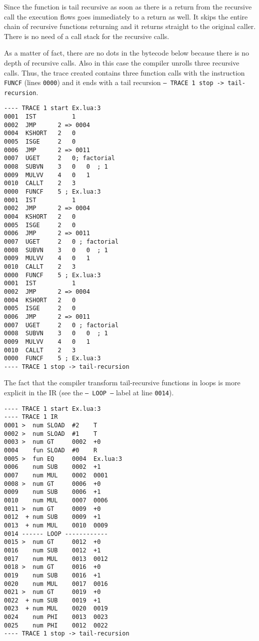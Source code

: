 \noindent
Since the function is tail recursive as soon as there is a return from the recursive call the execution flows goes immediately to a return as well. It skips the entire chain of recursive functions returning and it returns straight to the original caller. There is no need of a call stack for the recursive calls.

As a matter of fact, there are no dots in the bytecode below because there is no depth of recursive calls. Also in this case the compiler unrolls three recursive calls. Thus, the trace created contains three function calls with the instruction \texttt{FUNCF} (lines \texttt{0000}) and it ends with a tail recursion \texttt{-- TRACE 1 stop -> tail-recursion}.

\begin{multicols}{2}
\begin{lstlisting}[style=DumpStyle]
---- TRACE 1 start Ex.lua:3
0001  IST          1
0002  JMP      2 => 0004
0004  KSHORT   2   0
0005  ISGE     2   0
0006  JMP      2 => 0011
0007  UGET     2   0; factorial
0008  SUBVN    3   0   0  ; 1
0009  MULVV    4   0   1
0010  CALLT    2   3
0000  FUNCF    5 ; Ex.lua:3
0001  IST          1
0002  JMP      2 => 0004
0004  KSHORT   2   0
0005  ISGE     2   0
0006  JMP      2 => 0011
0007  UGET     2   0 ; factorial
0008  SUBVN    3   0   0  ; 1
0009  MULVV    4   0   1
0010  CALLT    2   3
0000  FUNCF    5 ; Ex.lua:3
0001  IST          1
0002  JMP      2 => 0004
0004  KSHORT   2   0
0005  ISGE     2   0
0006  JMP      2 => 0011
0007  UGET     2   0 ; factorial
0008  SUBVN    3   0   0  ; 1
0009  MULVV    4   0   1
0010  CALLT    2   3
0000  FUNCF    5 ; Ex.lua:3
---- TRACE 1 stop -> tail-recursion
\end{lstlisting}
\end{multicols}

\noindent
The fact that the compiler transform tail-recursive functions in loops is more explicit in the IR (see the \texttt{-- LOOP --} label at line \texttt{0014}).

\begin{multicols}{2}
\begin{lstlisting}[style=DumpStyle]
---- TRACE 1 start Ex.lua:3
---- TRACE 1 IR
0001 >  num SLOAD  #2    T
0002 >  num SLOAD  #1    T
0003 >  num GT     0002  +0  
0004    fun SLOAD  #0    R
0005 >  fun EQ     0004  Ex.lua:3
0006    num SUB    0002  +1  
0007    num MUL    0002  0001
0008 >  num GT     0006  +0  
0009    num SUB    0006  +1  
0010    num MUL    0007  0006
0011 >  num GT     0009  +0  
0012  + num SUB    0009  +1  
0013  + num MUL    0010  0009
0014 ------ LOOP ------------
0015 >  num GT     0012  +0  
0016    num SUB    0012  +1  
0017    num MUL    0013  0012
0018 >  num GT     0016  +0  
0019    num SUB    0016  +1  
0020    num MUL    0017  0016
0021 >  num GT     0019  +0  
0022  + num SUB    0019  +1  
0023  + num MUL    0020  0019
0024    num PHI    0013  0023
0025    num PHI    0012  0022
---- TRACE 1 stop -> tail-recursion
\end{lstlisting}
\end{multicols}